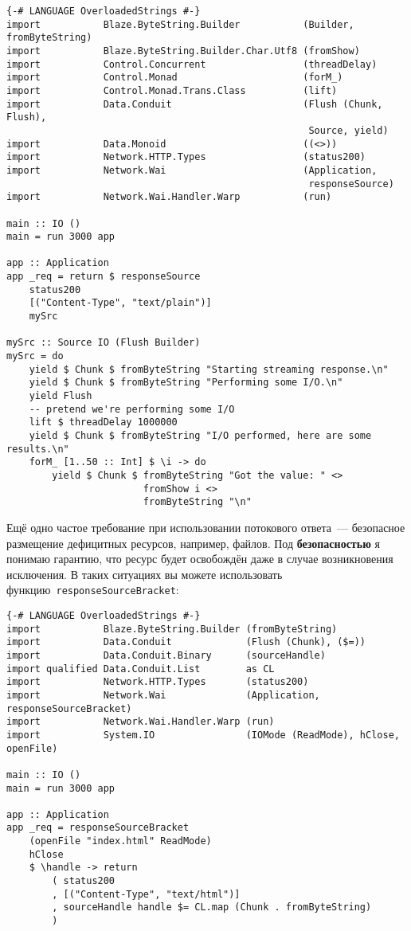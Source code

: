\begin{lstlisting}
{-# LANGUAGE OverloadedStrings #-}
import           Blaze.ByteString.Builder           (Builder, fromByteString)
import           Blaze.ByteString.Builder.Char.Utf8 (fromShow)
import           Control.Concurrent                 (threadDelay)
import           Control.Monad                      (forM_)
import           Control.Monad.Trans.Class          (lift)
import           Data.Conduit                       (Flush (Chunk, Flush),
                                                     Source, yield)
import           Data.Monoid                        ((<>))
import           Network.HTTP.Types                 (status200)
import           Network.Wai                        (Application,
                                                     responseSource)
import           Network.Wai.Handler.Warp           (run)

main :: IO ()
main = run 3000 app

app :: Application
app _req = return $ responseSource
    status200
    [("Content-Type", "text/plain")]
    mySrc

mySrc :: Source IO (Flush Builder)
mySrc = do
    yield $ Chunk $ fromByteString "Starting streaming response.\n"
    yield $ Chunk $ fromByteString "Performing some I/O.\n"
    yield Flush
    -- pretend we're performing some I/O
    lift $ threadDelay 1000000
    yield $ Chunk $ fromByteString "I/O performed, here are some results.\n"
    forM_ [1..50 :: Int] $ \i -> do
        yield $ Chunk $ fromByteString "Got the value: " <>
                        fromShow i <>
                        fromByteString "\n"
\end{lstlisting}

Ещё одно частое требование при использовании потокового ответа~--- безопасное
размещение дефицитных ресурсов, например, файлов. Под \textbf{безопасностью} я
понимаю гарантию, что ресурс будет освобождён даже в случае возникновения
исключения. В таких ситуациях вы можете использовать
функцию~\lstinline'responseSourceBracket':
\begin{lstlisting}
{-# LANGUAGE OverloadedStrings #-}
import           Blaze.ByteString.Builder (fromByteString)
import           Data.Conduit             (Flush (Chunk), ($=))
import           Data.Conduit.Binary      (sourceHandle)
import qualified Data.Conduit.List        as CL
import           Network.HTTP.Types       (status200)
import           Network.Wai              (Application, responseSourceBracket)
import           Network.Wai.Handler.Warp (run)
import           System.IO                (IOMode (ReadMode), hClose, openFile)

main :: IO ()
main = run 3000 app

app :: Application
app _req = responseSourceBracket
    (openFile "index.html" ReadMode)
    hClose
    $ \handle -> return
        ( status200
        , [("Content-Type", "text/html")]
        , sourceHandle handle $= CL.map (Chunk . fromByteString)
        )
\end{lstlisting}

